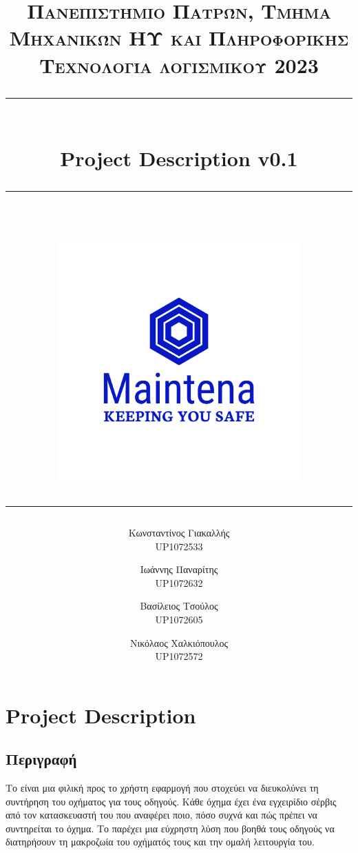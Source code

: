 \documentclass[11pt]{scrartcl} %
\title{	
	\normalfont\normalsize
	\textsc{Πανεπιστήμιο Πατρών, Τμήμα Μηχανικών ΗΥ και Πληροφορικής \\Τεχνολογία λογισμικού 2023}\\ %
	\vspace{25pt} %
	\rule{\linewidth}{0.5pt}\\ %
	\vspace{20pt} %
    {\Large Project Description v0.1}\\ %
	\vspace{12pt} %
	\rule{\linewidth}{0.5pt}\\ %
	\vspace{12pt} %
    \includegraphics[width=0.7\textwidth]{../../brand/png/logo-transparent.png}
        \rule{\linewidth}{2pt}
}
\author{
Κωνσταντίνος Γιακαλλής \\UP1072533 \and Ιωάννης Παναρίτης \\UP1072632 \and \hspace{4ex} Βασίλειος Τσούλος \\ \hspace{5ex}UP1072605 \and \hspace{1ex} Νικόλαος Χαλκιόπουλος \\ \hspace{1ex} UP1072572
}
\date{} %
\begin{document}
\maketitle
\pagebreak
\Large

\section*{Project Description}

\subsection*{Περιγραφή}

Το  είναι μια φιλική προς το χρήστη εφαρμογή που στοχεύει να διευκολύνει τη συντήρηση του οχήματος για τους οδηγούς. Κάθε όχημα έχει ένα εγχειρίδιο σέρβις από τον κατασκευαστή του που αναφέρει ποιο, πόσο συχνά και πώς πρέπει να συντηρείται το όχημα. Το  παρέχει μια εύχρηστη λύση που βοηθά τους οδηγούς να διατηρήσουν τη μακροζωία του οχήματός τους και την ομαλή λειτουργία του.
\end{document}
